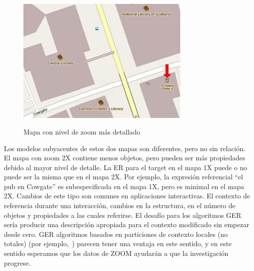 \begin{figure}[ht]
\begin{center}
\includegraphics[width=8.5cm]{figures/with-zoom.jpg}\\[0pt]
\caption{Mapa con nivel de zoom m\'as detallado}
\label{fig-with-zoom}
\end{center}
\end{figure}


 Los modelos subyacentes de estos dos mapas son diferentes, pero no sin relaci\'on. El mapa con zoom 2X contiene menos objetos, pero pueden ser m\'as propiedades debido al mayor nivel de detalle. La ER para el target en el mapa 1X puede o no puede ser la misma que en el mapa 2X. Por ejemplo, la expresi\'on referencial ``el pub en Cowgate'' es subespecificada en el mapa 1X, pero es minimal en el mapa 2X. Cambios de este tipo son comunes en aplicaciones interactivas. El contexto de referencia durante una interacci\'on, cambios en la estructura, en el n\'umero de objetos y propiedades a las cuales referirse. El desaf\'{i}o para los algoritmos GER ser\'{i}a producir una descripci\'on apropiada para el contexto modificado sin empezar desde cero. GER algoritmos basados en particiones de  contexto locales (no totales) (por ejemplo,~\cite{areces08}) parecen tener una ventaja en este sentido, y en este sentido esperamos que los datos de ZOOM ayudar\'an a que la investigaci\'on progrese.


